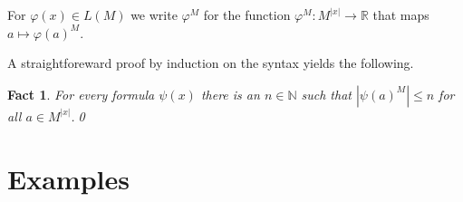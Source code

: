 \documentclass[12pt,letterpaper,oneside,reqno]{amsart}
\theoremstyle{plain}
\newtheorem{fact}[theorem]{Fact}
\theoremstyle{remark}
\begin{document}
For $\varphi(x)\in L(M)$ we write $\varphi^M$ for the function $\varphi^M:M^{|x|}\to{\mathds R}$ that maps $a\mapsto\varphi(a)^M$.

A straightforeward proof by induction on the syntax yields the following.

\begin{fact}\label{fact_finiteness}
  For every formula $\psi(x)$ there is an $n\in{\mathds N}$ such that $|\psi(a)^M|\le n$ for all $a\in M^{|x|}$.\qed
\end{fact}


\section{Examples}

\def\ceq#1#2#3{\parbox[t]{25ex}{$\displaystyle #1$}\parbox{5ex}{\hfil $#2$}{$\displaystyle #3$}}
\end{document}
